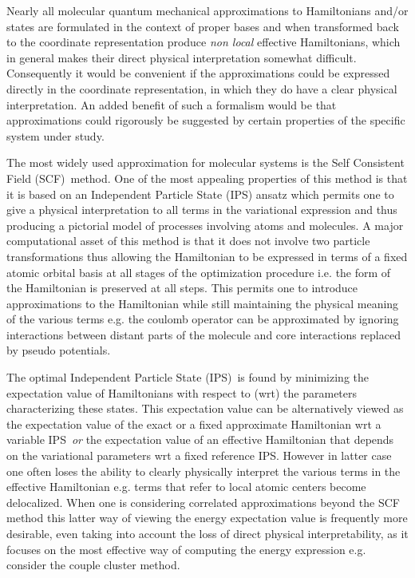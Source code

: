 \documentclass[aps,preprint]{revtex4}%
\begin{document}
Nearly all molecular quantum mechanical approximations to Hamiltonians and/or
states are formulated in the context of proper bases and when transformed back
to the coordinate representation produce \emph{non local }effective
Hamiltonians, which in general makes their direct physical interpretation
somewhat difficult. Consequently it would be convenient if the approximations
could be expressed directly in the coordinate representation, in which they do
have a clear physical interpretation. An added benefit of such a formalism
would be that approximations could rigorously be suggested by certain
properties of the specific system under study.

The most widely used approximation for molecular systems is the Self
Consistent Field (SCF)\ method. One of the most appealing properties of this
method is that it is based on an Independent Particle State (IPS) ansatz which
permits one to give a physical interpretation to all terms in the variational
expression and thus producing a pictorial model of processes involving atoms
and molecules. A major computational asset of this method is that it does not
involve two particle transformations thus allowing the Hamiltonian to be
expressed in terms of a fixed atomic orbital basis at all stages of the
optimization procedure i.e. the form of the Hamiltonian is preserved at all
steps. This permits one to introduce approximations to the Hamiltonian while
still maintaining the physical meaning of the various terms e.g. the coulomb
operator can be approximated by ignoring interactions between distant parts of
the molecule and core interactions replaced by pseudo potentials.

The optimal Independent Particle State (IPS)\ is found by minimizing the
expectation value of Hamiltonians with respect to (wrt) the parameters
characterizing these states. This expectation value can be alternatively
viewed as the expectation value of the exact or a fixed approximate
Hamiltonian wrt a variable IPS\ \emph{or} the expectation value of an
effective Hamiltonian that depends on the variational parameters wrt a fixed
reference IPS. However in latter case one often loses the ability to clearly
physically interpret the various terms in the effective Hamiltonian e.g. terms
that refer to local atomic centers become delocalized. When one is considering
correlated approximations beyond the SCF method this latter way of viewing the
energy expectation value is frequently more desirable, even taking into
account the loss of direct physical interpretability, as it focuses on the
most effective way of computing the energy expression e.g. consider the couple
cluster method.
\end{document}
